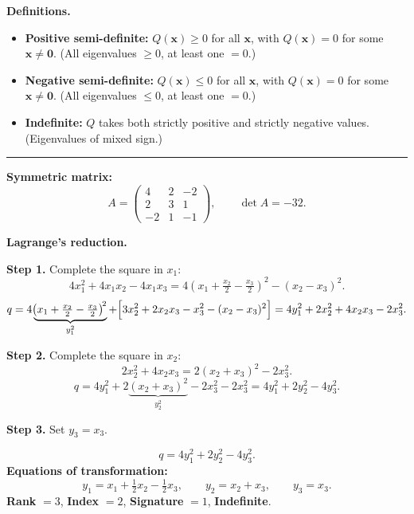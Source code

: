 \documentclass[12pt,a3paper]{article}
\begin{document}
\begin{tcolorbox}[enhanced,breakable,
  colback=cE!4,colframe=cE,boxrule=0.8pt,arc=5pt,
  title={\textbf{Answer --- Semi-definite, Indefinite QFs \& Canonical Form of
    $q = 4x_1^2+3x_2^2-x_3^2+4x_1x_2-4x_1x_3+2x_2x_3$}},
  fonttitle=\bfseries\color{white},colbacktitle=cE]

\textbf{Definitions.}
\begin{itemize}[itemsep=2pt]
  \item \textbf{Positive semi-definite:} $Q(\mathbf{x}) \geq 0$ for all $\mathbf{x}$,
        with $Q(\mathbf{x})=0$ for some $\mathbf{x}\neq\mathbf{0}$.
        (All eigenvalues $\geq 0$, at least one $= 0$.)
  \item \textbf{Negative semi-definite:} $Q(\mathbf{x}) \leq 0$ for all $\mathbf{x}$,
        with $Q(\mathbf{x})=0$ for some $\mathbf{x}\neq\mathbf{0}$.
        (All eigenvalues $\leq 0$, at least one $= 0$.)
  \item \textbf{Indefinite:} $Q$ takes both strictly positive and strictly negative
        values. (Eigenvalues of mixed sign.)
\end{itemize}

\medskip\textcolor{cE}{\rule{\textwidth}{0.4pt}}

\textbf{Symmetric matrix:}
\[
  A = \begin{pmatrix}4&2&-2\\2&3&1\\-2&1&-1\end{pmatrix}, \qquad \det A = -32.
\]

\textbf{Lagrange's reduction.}

\textbf{Step 1.} Complete the square in $x_1$:
\[
  4x_1^2 + 4x_1 x_2 - 4x_1 x_3
  = 4\!\left(x_1 + \tfrac{x_2}{2} - \tfrac{x_3}{2}\right)^{\!2} - (x_2-x_3)^2.
\]
\[
  q = 4\underbrace{\!\left(x_1+\tfrac{x_2}{2}-\tfrac{x_3}{2}\right)^{\!2}}_{y_1^2}
    +\Bigl[3x_2^2+2x_2 x_3-x_3^2-(x_2-x_3)^2\Bigr]
  = 4y_1^2 + 2x_2^2 + 4x_2 x_3 - 2x_3^2.
\]

\textbf{Step 2.} Complete the square in $x_2$:
\[
  2x_2^2 + 4x_2 x_3 = 2(x_2+x_3)^2 - 2x_3^2.
\]
\[
  q = 4y_1^2 + 2\underbrace{(x_2+x_3)^2}_{y_2^2} - 2x_3^2 - 2x_3^2
  = 4y_1^2 + 2y_2^2 - 4y_3^2.
\]

\textbf{Step 3.} Set $y_3 = x_3$.

\medskip
\[
  \boxed{q = 4y_1^2 + 2y_2^2 - 4y_3^2.}
\]
\textbf{Equations of transformation:}
\[
  y_1 = x_1 + \tfrac{1}{2}x_2 - \tfrac{1}{2}x_3, \qquad
  y_2 = x_2 + x_3, \qquad
  y_3 = x_3.
\]
\textbf{Rank} $= 3$, \textbf{Index} $= 2$, \textbf{Signature} $= 1$, \textbf{Indefinite}.

\end{tcolorbox}
\end{document}
